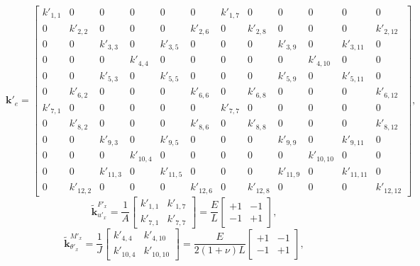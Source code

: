 \documentclass[12pt,a4paper,article]{memoir} %
\begin{document}
\begin{equation}
  \mathbf{k}'_e = \left[ \begin{array}{cccccccccccc}
      k'_{1,1} & 0 & 0 & 0 & 0 & 0 & k'_{1,7} & 0 & 0 & 0 & 0 & 0 \\
      0 & k'_{2,2} & 0 & 0 & 0 & k'_{2,6} & 0 & k'_{2,8} & 0 & 0 & 0 & k'_{2,12} \\
      0 & 0 & k'_{3,3} & 0 & k'_{3,5} & 0 & 0 & 0 & k'_{3,9} & 0 & k'_{3,11} & 0 \\
      0 & 0 & 0 & k'_{4,4} & 0 & 0 & 0 & 0 & 0 & k'_{4,10} & 0 & 0 \\
      0 & 0 & k'_{5,3} & 0 & k'_{5,5} & 0 & 0 & 0 & k'_{5,9} & 0 & k'_{5,11} & 0 \\
      0 & k'_{6,2} & 0 & 0 & 0 & k'_{6,6} & 0 & k'_{6,8} & 0 & 0 & 0 & k'_{6,12} \\
      k'_{7,1} & 0 & 0 & 0 & 0 & 0 & k'_{7,7} & 0 & 0 & 0 & 0 & 0 \\
      0 & k'_{8,2} & 0 & 0 & 0 & k'_{8,6} & 0 & k'_{8,8} & 0 & 0 & 0 & k'_{8,12} \\
      0 & 0 & k'_{9,3} & 0 & k'_{9,5} & 0 & 0 & 0 & k'_{9,9} & 0 & k'_{9,11} & 0 \\
      0 & 0 & 0 & k'_{10,4} & 0 & 0 & 0 & 0 & 0 & k'_{10,10} & 0 & 0 \\
      0 & 0 & k'_{11,3} & 0 & k'_{11,5} & 0 & 0 & 0 & k'_{11,9} & 0 & k'_{11,11} & 0 \\
      0 & k'_{12,2} & 0 & 0 & 0 & k'_{12,6} & 0 & k'_{12,8} & 0 & 0 & 0 & k'_{12,12} 
      \end{array} \right],
\end{equation}
\begin{equation}
  \tilde{\mathbf{k}}_{u'_x}^{F'_x} = \frac{1}{A} \left[ \begin{array}{cc}
      k'_{1,1} & k'_{1,7} \\ k'_{7,1} & k'_{7,7} \end{array} \right] = \frac{E}{L} \left[ \begin{array}{cc}
      +1 & -1 \\ -1 & +1 \end{array} \right],
\end{equation}
\begin{equation}
  \tilde{\mathbf{k}}_{\theta'_x}^{M'_x} = \frac{1}{J} \left[ \begin{array}{cc}
      k'_{4,4} & k'_{4,10} \\ k'_{10,4} & k'_{10,10} \end{array} \right] = \frac{E}{2(1+\nu)L} \left[ \begin{array}{cc}
      +1 & -1 \\ -1 & +1 \end{array} \right],
\end{equation}
\end{document}
